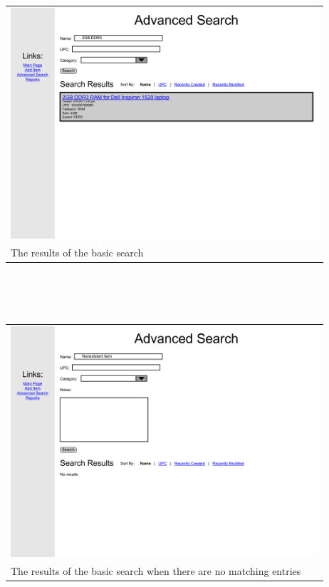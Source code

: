 \documentclass{article}
\begin{document}
\begin{tabular}{ p{4.5in} }
\includegraphics[keepaspectratio, width=4.5in]{basicSearchF0S1.pdf} \\
The results of the basic search
\end{tabular}\\
~\\
~\\
\begin{tabular}{ p{4.5in} }
\includegraphics[keepaspectratio, width=4.5in]{basicSearchF2S1.pdf} \\
The results of the basic search when there are no matching entries
\end{tabular}
~\\
~\\
\end{document}
